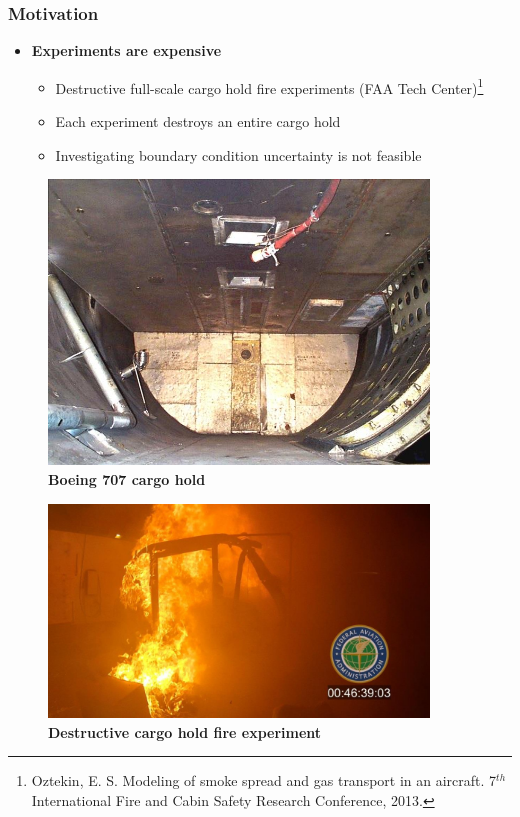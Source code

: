 \documentclass[9pt]{beamer}
\begin{document}
\begin{frame}
\frametitle{Motivation}
\label{sec-4-4}

\begin{itemize}
\item \textbf{Experiments are expensive}
\begin{itemize}
\item Destructive full-scale cargo hold fire experiments (FAA Tech Center)\footnote{Oztekin, E. S. Modeling of smoke spread and gas
transport in an aircraft. 7$^{th}$ International Fire and Cabin Safety
Research Conference, 2013.
 }
\item Each experiment destroys an entire cargo hold
\item Investigating boundary condition uncertainty is not feasible
\end{itemize}
\end{itemize}
\centering
\begin{minipage}[b]{0.45\linewidth}
\begin{figure}[ht]
\includegraphics[width=0.9\textwidth]{Boeing707CargoHold} \\
\textbf{Boeing 707 cargo hold}
\end{figure}
\end{minipage}
\begin{minipage}[b]{0.45\linewidth}
\begin{figure}[ht]
\includegraphics[width=0.9\textwidth]{CargoHoldFire1.png} \\
\textbf{Destructive cargo hold fire experiment}
\end{figure}
\end{minipage}
\end{frame}
\end{document}
